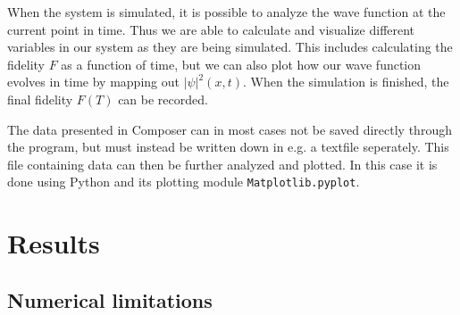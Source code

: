 \documentclass[a4paper, twocolumn]{revtex4-1}
\begin{document}
When the system is simulated, it is possible to analyze the wave function at the current point in time. Thus we are able to calculate and visualize different variables in our system as they are being simulated. This includes calculating the fidelity $F$ as a function of time, but we can also plot how our wave function evolves in time by mapping out $|\psi|^2(x,t)$. When the simulation is finished, the final fidelity $F(T)$ can be recorded.


The data presented in Composer can in most cases not be saved directly through the program, but must instead be written down in e.g. a textfile seperately. This file containing data can then be further analyzed and plotted. In this case it is done using Python and its plotting module \texttt{Matplotlib.pyplot}.


\section{Results}\label{sec:results}
\subsection{\label{subsec:numericalLimitations} Numerical limitations}
\end{document}
